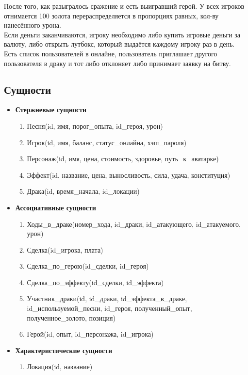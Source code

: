 После того, как разыгралось сражение и есть выигравший герой. У всех игроков отнимается 100 золота перераспределяется в пропорциях равных, кол-ву нанесённого урона. \\

Если деньги заканчиваются, игроку необходимо либо купить игровые деньги за валюту, либо открыть лутбокс, который выдаётся каждому игроку раз в день. \\

Есть список пользователей в онлайне, пользователь приглашает другого пользователя в драку и тот либо отклоняет либо принимает заявку на битву.


\subsection*{Сущности}


\begin{itemize}
\item \textbf{Стержневые сущности}
\begin{enumerate}
    \item Песня(id, имя, порог\_опыта, id\_героя, урон)
    \item Игрок(id, имя, баланс, статус\_онлайна, хэш\_пароля)
    \item Персонаж(id, имя, цена, стоимость, здоровье, путь\_к\_аватарке)
    \item Эффект(id, название, цена, выносливость, сила, удача, конституция)
    \item Драка(id, время\_начала, id\_локации)
\end{enumerate}

\item \textbf{Ассоциативные сущности}
\begin{enumerate}
    \item Ходы\_в\_драке(номер\_хода, id\_драки, id\_атакующего, id\_атакуемого, урон)
    \item Сделка(id\_игрока, плата)
    \item Сделка\_по\_герою(id\_сделки, id\_героя)
    \item Сделка\_по\_эффекту(id\_сделки, id\_эффекта)
    \item Участник\_драки(id, id\_драки, id\_эффекта\_в\_драке, id\_используемой\_песни, id\_героя, полученный\_опыт, полученное\_золото, позиция)
    \item Герой(id, опыт, id\_персонажа, id\_игрока)
\end{enumerate}

\item \textbf{Характеристические сущности}
\begin{enumerate}
    \item Локация(id, название)
\end{enumerate}
\end{itemize}

